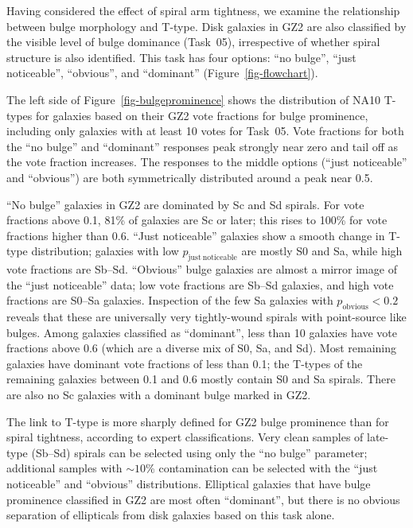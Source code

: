 \documentclass[useAMS,usenatbib]{mn2e}
\begin{document}
Having considered the effect of spiral arm tightness, we examine the relationship between bulge morphology and T-type. Disk galaxies in GZ2 are also classified by the visible level of bulge dominance (Task~05), irrespective of whether spiral structure is also identified. This task has four options: ``no bulge'', ``just noticeable'', ``obvious'', and ``dominant'' (Figure~\ref{fig-flowchart}). 

The left side of Figure~\ref{fig-bulgeprominence} shows the distribution of NA10 T-types for galaxies based on their GZ2 vote fractions for bulge prominence, including only galaxies with at least 10 votes for Task~05. Vote fractions for both the ``no bulge'' and ``dominant'' responses peak strongly near zero and tail off as the vote fraction increases. The responses to the middle options (``just noticeable'' and ``obvious'') are both symmetrically distributed around a peak near 0.5. 

``No bulge'' galaxies in GZ2 are dominated by Sc and Sd spirals. For vote fractions above 0.1, 81\% of galaxies are Sc or later; this rises to 100\% for vote fractions higher than 0.6. ``Just noticeable'' galaxies show a smooth change in T-type distribution; galaxies with low $p_\mathrm{just~noticeable}$ are mostly S0 and Sa, while high vote fractions are Sb--Sd. ``Obvious'' bulge galaxies are almost a mirror image of the ``just noticeable'' data; low vote fractions are Sb--Sd galaxies, and high vote fractions are S0--Sa galaxies. Inspection of the few Sa galaxies with $p_\mathrm{obvious}<0.2$ reveals that these are universally very tightly-wound spirals with point-source like bulges. Among galaxies classified as ``dominant'', less than 10 galaxies have vote fractions above 0.6 (which are a diverse mix of S0, Sa, and Sd). Most remaining galaxies have dominant vote fractions of less than 0.1; the T-types of the remaining galaxies between 0.1 and 0.6 mostly contain S0 and Sa spirals. There are also no Sc galaxies with a dominant bulge marked in GZ2. 

The link to T-type is more sharply defined for GZ2 bulge prominence than for spiral tightness, according to expert classifications. Very clean samples of late-type (Sb--Sd) spirals can be selected using only the ``no bulge'' parameter; additional samples with $\sim10$\% contamination can be selected with the ``just noticeable'' and ``obvious'' distributions. Elliptical galaxies that have bulge prominence classified in GZ2 are most often ``dominant'', but there is no obvious separation of ellipticals from disk galaxies based on this task alone. 
\end{document}
